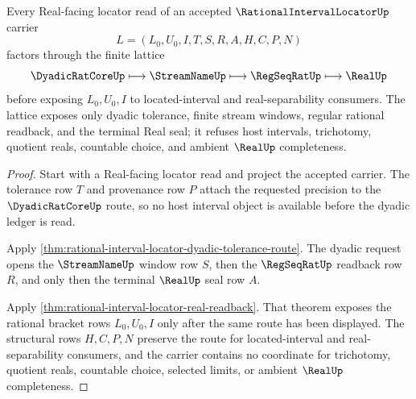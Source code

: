 \begin{theorem}
\label{thm:rational-interval-locator-real-seal-lattice}
Every Real-facing locator read of an accepted $\RationalIntervalLocatorUp$ carrier
$$
L=(L_0,U_0,I,T,S,R,A,H,C,P,N)
$$
factors through the finite lattice
$$
\DyadicRatCoreUp\longmapsto \StreamNameUp\longmapsto \RegSeqRatUp\longmapsto \RealUp
$$
before exposing $L_0,U_0,I$ to located-interval and real-separability consumers. The lattice exposes only dyadic tolerance, finite stream windows, regular rational readback, and the terminal Real seal; it refuses host intervals, trichotomy, quotient reals, countable choice, and ambient $\RealUp$ completeness.
\end{theorem}
\begin{proof}
Start with a Real-facing locator read and project the accepted carrier. The tolerance row $T$ and provenance row $P$ attach the requested precision to the $\DyadicRatCoreUp$ route, so no host interval object is available before the dyadic ledger is read.

Apply \autoref{thm:rational-interval-locator-dyadic-tolerance-route}. The dyadic request opens the $\StreamNameUp$ window row $S$, then the $\RegSeqRatUp$ readback row $R$, and only then the terminal $\RealUp$ seal row $A$.

Apply \autoref{thm:rational-interval-locator-real-readback}. That theorem exposes the rational bracket rows $L_0,U_0,I$ only after the same route has been displayed. The structural rows $H,C,P,N$ preserve the route for located-interval and real-separability consumers, and the carrier contains no coordinate for trichotomy, quotient reals, countable choice, selected limits, or ambient $\RealUp$ completeness.
\end{proof}


\begin{closurestatus}{\RationalIntervalLocatorUp}
  \theoryclosure{\obligationClosure}
  \formalstatus{\unformalizedV}
\end{closurestatus}

